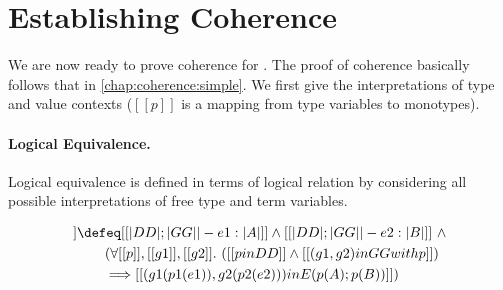 \section{Establishing Coherence}

We are now ready to prove coherence for \fnamee. The proof of coherence
basically follows that in \cref{chap:coherence:simple}. We first give the
interpretations of type and value contexts ($[[p]]$ is a mapping from type
variables to monotypes).

\begin{definition}
\end{definition}


\begin{definition}
\end{definition}


\paragraph{Logical Equivalence.}

Logical equivalence is defined in terms of logical relation by considering all possible interpretations of
free type and term variables.

\begin{definition}
  \begin{align*}
    [[DD ; GG |- e1 == e2 : A ; B]]  & \defeq  [[|DD| ; |GG| |- e1 : |A|]] \land [[ |DD | ; |GG| |- e2 : | B | ]] \ \land \\
                                       & \qquad (\forall [[p]], [[g1]], [[g2]]. \ ([[p in DD]] \land [[(g1, g2) in GG with p ]]) \\
                                       & \qquad \Longrightarrow [[(g1 (p1 (e1)), g2 (p2 (e2)))  in E (p(A) ; p(B)) ]])
  \end{align*}
\end{definition}



